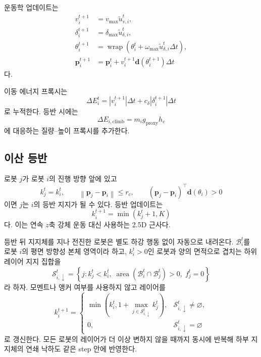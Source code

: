 \documentclass[11pt,a4paper]{article}
\newcommand{\norm}[1]{\left\lVert #1\right\rVert}
\begin{document}
운동학 업데이트는
\begin{align}
  v_i^{t+1}
    &=v_{\max}\widetilde{u}_{v,i}^t,\\
  \delta_i^{t+1}
    &=\delta_{\max}\widetilde{u}_{\delta,i}^t,\\
  \theta_i^{t+1}
    &=\operatorname{wrap}\!\left(
      \theta_i^t+
      \omega_{\max}\widetilde{u}_{\delta,i}^t\Delta t
    \right),\\
  \bm{p}_i^{t+1}
    &=\bm{p}_i^t+
      v_i^{t+1}\bm{d}(\theta_i^{t+1})\Delta t
  \label{eq:kinematics}
\end{align}
다.

이동 에너지 프록시는
\begin{equation}
  \Delta E_i^t=
  |v_i^{t+1}|\Delta t+
  c_\delta|\delta_i^{t+1}|\Delta t
\end{equation}
로 누적한다. 등반 시에는
\begin{equation}
  \Delta E_{i,\mathrm{climb}}=m_i g_{\mathrm{proxy}}h_c
\end{equation}
에 대응하는 질량--높이 프록시를 추가한다.

\subsection{이산 등반}

로봇 \(j\)가 로봇 \(i\)의 진행 방향 앞에 있고
\begin{equation}
  k_j^t=k_i^t,
  \qquad
  \norm{\bm{p}_j-\bm{p}_i}\le r_c,
  \qquad
  (\bm{p}_j-\bm{p}_i)^\top\bm{d}(\theta_i)>0
\end{equation}
이면 \(j\)는 \(i\)의 등반 지지가 될 수 있다. 등반 업데이트는
\begin{equation}
  k_i^{t+1}=
  \min(k_j^t+1,K)
\end{equation}
다. 이는 연속 \(z\)축 강체 운동 대신 사용하는 2.5D 근사다.

등반 뒤 지지체를 지나 전진한 로봇은 별도 하강 행동 없이 자동으로 내려온다.
\(\mathcal{B}_i^t\)를 로봇 \(i\)의 평면 방향성 본체 영역이라 하고,
\(k_i^t>0\)인 로봇과 양의 면적으로 겹치는 하위 레이어 지지 집합을
\begin{equation}
  \mathcal{S}_{i,\downarrow}^t=
  \left\{
    j:
    k_j^t<k_i^t,\;
    \operatorname{area}(\mathcal{B}_i^t\cap\mathcal{B}_j^t)>0,\;
    f_j^t=0
  \right\}
\end{equation}
라 하자. 모멘트나 앵커 여부를 사용하지 않고 레이어를
\begin{equation}
  k_i^{t+1}=
  \begin{cases}
    \min\left(k_i^t,1+\max_{j\in\mathcal{S}_{i,\downarrow}^t} k_j^t\right),
      & \mathcal{S}_{i,\downarrow}^t\ne\varnothing,\\
    0, & \mathcal{S}_{i,\downarrow}^t=\varnothing
  \end{cases}
\end{equation}
로 갱신한다. 모든 로봇의 레이어가 더 이상 변하지 않을 때까지 동시에 반복해
하부 지지체의 연쇄 낙하도 같은 step 안에 반영한다.
\end{document}
